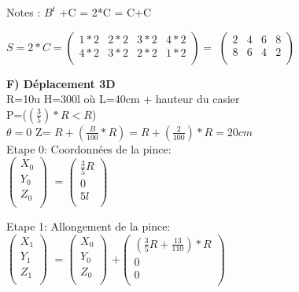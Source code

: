 Notes : $ B^{t}$ +C = 2*C = C+C
\vspace{5mm} %

$
S = 2*C =
\begin{pmatrix}
  1*2 & 2*2 & 3*2 & 4*2 \\
  4*2 & 3*2 & 2*2 & 1*2 \\
\end{pmatrix}
=
$
\vspace{5mm} %
$
\begin{pmatrix}
  2 & 4 & 6 & 8 \\
  8 & 6 & 4 & 2 \\
\end{pmatrix}
$

\newpage

\textbf{F) Déplacement 3D} \\

R=10u H=300l où L=40cm + hauteur du casier \\
P=($(\frac{3}{5})* R<R$) \\
$\theta =0$ Z= $R+(\frac{B}{100}*R) = R+(\frac{2}{100})*R=20cm $ \\

Etape 0: Coordonnées de la pince: \\

$
\begin{pmatrix}
  X_{0} \\
  Y_{0} \\
  Z_{0} \\
\end{pmatrix}
$
\vspace{3mm} %
$
=
\begin{pmatrix}
  \frac{3}{5}R \\
  0 \\
  5l \\
\end{pmatrix}
$

Etape 1: Allongement de la pince: \\

$
\begin{pmatrix}
  X_{1} \\
  Y_{1} \\
  Z_{1} \\
\end{pmatrix}
$
\vspace{3mm} %
$
=
\begin{pmatrix}
  X_{0} \\
  Y_{0} \\
  Z_{0} \\
\end{pmatrix}
$
\vspace{3mm} %
$
 +
\begin{pmatrix}
 (\frac{3}{5}R + \frac{13}{110})*R  \\
  0 \\
  0 \\
\end{pmatrix}
$

